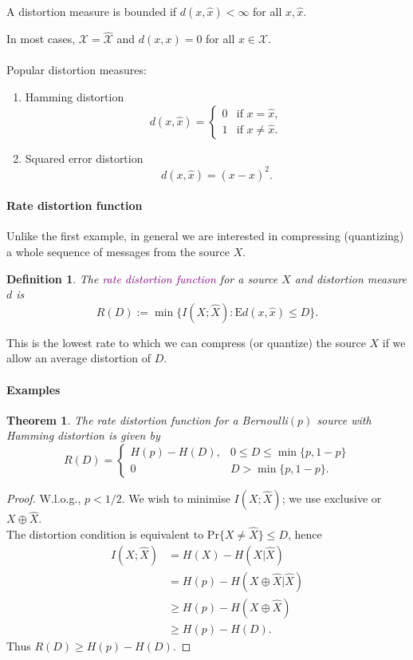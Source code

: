 \documentclass[a4paper, 11pt, openany]{book}
\numberwithin{equation}{section}
\theoremstyle{plain}
\newtheorem{theorem}	[equation]	{Theorem}
\newtheorem{definition}	[equation]	{Definition}
\theoremstyle{definition}
\newcommand{\Define}[1]{\textcolor{purple}{#1}}
\newcommand{\alphabet}[1]{\mathcal{#1}}
\begin{document}
A distortion measure is bounded if $d(x,\hat{x}) < \infty$ for all $x, \hat{x}$.

In most cases, $\alphabet{X} = \hat{\alphabet{X}}$ and $d(x,x) = 0$ for all $x \in \alphabet{X}$.\\
~\\
Popular distortion measures:
\begin{enumerate}
	\item Hamming distortion
	$$
		d(x,\hat{x}) = \begin{cases}
		0 &\text{if } x = \hat{x},\\
		1&\text{if } x \ne \hat{x}.
		\end{cases}
	$$
	
	\item Squared error distortion
	$$
		d(x,\hat{x}) = (x - \hat{x})^2.
	$$
\end{enumerate}




\paragraph{Rate distortion function}

Unlike the first example, in general we are interested in compressing (quantizing) a whole sequence of messages from the source $X$.

\begin{definition}
The \Define{rate distortion function} for a source $X$ and distortion measure $d$ is
$$
	R(D) := \min \{ I(X; \hat{X}) : \mathrm{E} d(x,\hat{x}) \le D\}.
$$
\end{definition}

This is the lowest rate to which we can compress (or quantize) the source $X$ if we allow an average distortion of $D$.




\paragraph{Examples}
\begin{theorem}
The rate distortion function for a Bernoulli$(p)$ source with Hamming distortion is given by
$$
	R(D) = \begin{cases}
	H(p) - H(D), & 0 \le D \le \min\{p,1-p\}\\
	0 & D > \min\{p,1-p\}.
	\end{cases}
$$
\end{theorem}

\begin{proof}
W.l.o.g., $p < 1/2$. We wish to minimise $I(X;\hat{X})$; we use exclusive or $X \oplus \hat{X}$.\\
The distortion condition is equivalent to $\mathrm{Pr}\{X \ne \hat{X}\} \le D$, hence
\begin{align*}
	I(X; \hat{X}) &= H(X) - H(X | \hat{X})\\
	&= H(p) - H(X \oplus \hat{X} | \hat{X})\\
	&\ge H(p) - H(X \oplus \hat{X})\\
	&\ge H(p) - H(D).
\end{align*}
Thus $R(D) \ge H(p) - H(D)$.
\end{proof}
\end{document}
